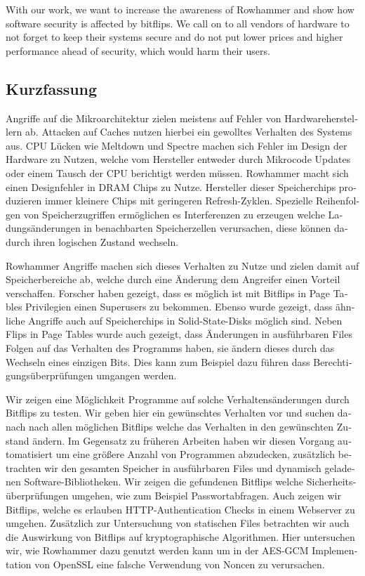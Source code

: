 With our work, we want to increase the awareness of Rowhammer and show how
software security is affected by bitflips. We call on to all vendors of hardware
to not forget to keep their systems secure and do not put lower prices and
higher performance ahead of security, which would harm their users.
\cleardoublepage
{}
{}
\begin{otherlanguage}{ngerman}
\chapter*{Kurzfassung}
\label{cha:kurzfassung}

Angriffe auf die Mikroarchitektur zielen meistens auf Fehler von
Hardwareherstellern ab. Attacken auf Caches nutzen hierbei ein gewolltes
Verhalten des Systems aus. CPU Lücken wie Meltdown und Spectre machen
sich Fehler im Design der Hardware zu Nutzen, welche vom Hersteller
entweder durch Mikrocode Updates oder einem Tausch der CPU berichtigt werden
müssen. Rowhammer macht sich einen Designfehler in DRAM Chips zu Nutze.
Hersteller dieser Speicherchips produzieren immer kleinere Chips mit
geringeren Refresh-Zyklen. Spezielle Reihenfolgen von Speicherzugriffen
ermöglichen es Interferenzen zu erzeugen welche Ladungsänderungen in
benachbarten Speicherzellen verursachen, diese können dadurch ihren logischen
Zustand wechseln.

Rowhammer Angriffe machen sich dieses Verhalten zu Nutze und zielen damit auf
Speicherbereiche ab, welche durch eine Änderung dem Angreifer einen Vorteil
verschaffen. Forscher haben gezeigt, dass es möglich ist mit Bitflips in Page
Tables Privilegien einen Superusers zu bekommen. Ebenso wurde gezeigt, dass
ähnliche Angriffe auch auf Speicherchips in Solid-State-Disks möglich sind.
Neben Flips in Page Tables wurde auch gezeigt, dass Änderungen in ausführbaren
Files Folgen auf das Verhalten des Programms haben, sie ändern dieses durch das
Wechseln eines einzigen Bits. Dies kann zum Beispiel dazu führen dass
Berechtigungsüberprüfungen umgangen werden.

Wir zeigen eine Möglichkeit Programme auf solche Verhaltensänderungen durch
Bitflips zu testen. Wir geben hier ein gewünschtes Verhalten vor und suchen
danach nach allen möglichen Bitflips welche das Verhalten in den gewünschten
Zustand ändern. Im Gegensatz zu früheren Arbeiten haben wir diesen Vorgang
automatisiert um eine größere Anzahl von Programmen abzudecken, zusätzlich
betrachten wir den gesamten Speicher in ausführbaren Files und dynamisch
geladenen Software-Bibliotheken. Wir zeigen die gefundenen Bitflips welche
Sicherheitsüberprüfungen umgehen, wie zum Beispiel Passwortabfragen. Auch
zeigen wir Bitflips, welche es erlauben HTTP-Authentication Checks in einem
Webserver zu umgehen. Zusätzlich zur Untersuchung von statischen Files
betrachten wir auch die Auswirkung von Bitflips auf kryptographische
Algorithmen. Hier untersuchen wir, wie Rowhammer dazu genutzt werden kann um in
der AES-GCM Implementation von OpenSSL eine falsche Verwendung von Noncen zu
verursachen.


\end{otherlanguage}
